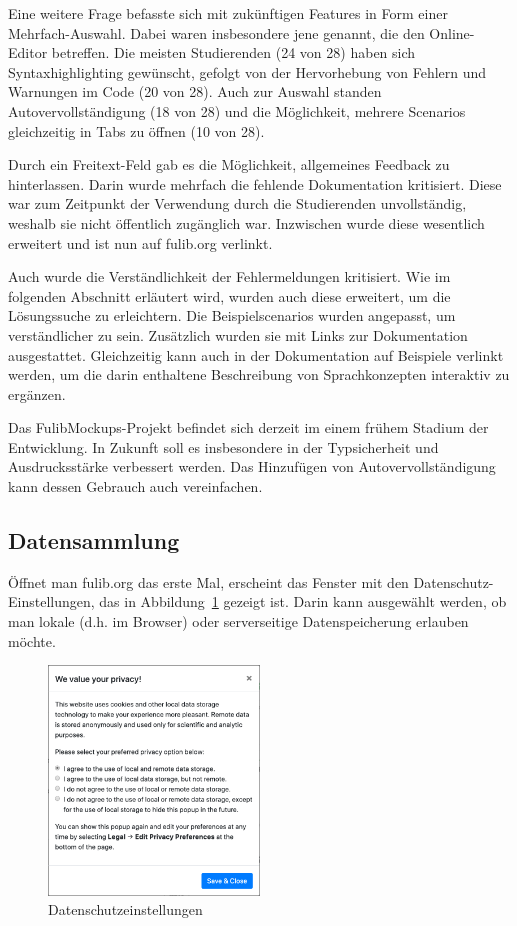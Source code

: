 Eine weitere Frage befasste sich mit zukünftigen Features in Form einer Mehrfach-Auswahl.
Dabei waren insbesondere jene genannt, die den Online-Editor betreffen.
Die meisten Studierenden (24 von 28) haben sich Syntaxhighlighting gewünscht, gefolgt von der Hervorhebung von Fehlern und Warnungen im Code (20 von 28).
Auch zur Auswahl standen Autovervollständigung (18 von 28) und die Möglichkeit, mehrere Scenarios gleichzeitig in Tabs zu öffnen (10 von 28).

Durch ein Freitext-Feld gab es die Möglichkeit, allgemeines Feedback zu hinterlassen.
Darin wurde mehrfach die fehlende Dokumentation kritisiert.
Diese war zum Zeitpunkt der Verwendung durch die Studierenden unvollständig, weshalb sie nicht öffentlich zugänglich war.
Inzwischen wurde diese wesentlich erweitert und ist nun auf fulib.org verlinkt.

Auch wurde die Verständlichkeit der Fehlermeldungen kritisiert.
Wie im folgenden Abschnitt erläutert wird, wurden auch diese erweitert, um die Lösungssuche zu erleichtern.
Die Beispielscenarios wurden angepasst, um verständlicher zu sein.
Zusätzlich wurden sie mit Links zur Dokumentation ausgestattet.
Gleichzeitig kann auch in der Dokumentation auf Beispiele verlinkt werden, um die darin enthaltene Beschreibung von Sprachkonzepten interaktiv zu ergänzen.

Das FulibMockups-Projekt befindet sich derzeit im einem frühem Stadium der Entwicklung.
In Zukunft soll es insbesondere in der Typsicherheit und Ausdrucksstärke verbessert werden.
Das Hinzufügen von Autovervollständigung kann dessen Gebrauch auch vereinfachen.

\subsection{Datensammlung}\label{subsec:data-collection}

Öffnet man fulib.org das erste Mal, erscheint das Fenster mit den Datenschutz-Einstellungen, das in Abbildung~\ref{fig:privacy} gezeigt ist.
Darin kann ausgewählt werden, ob man lokale (d.h. im Browser) oder serverseitige Datenspeicherung erlauben möchte.

\begin{figure}
    \centering
    \includegraphics[width=0.5\textwidth]{chapter/fulib.org/img/privacy.png}
    \caption{Datenschutzeinstellungen}
    \label{fig:privacy}
\end{figure}

